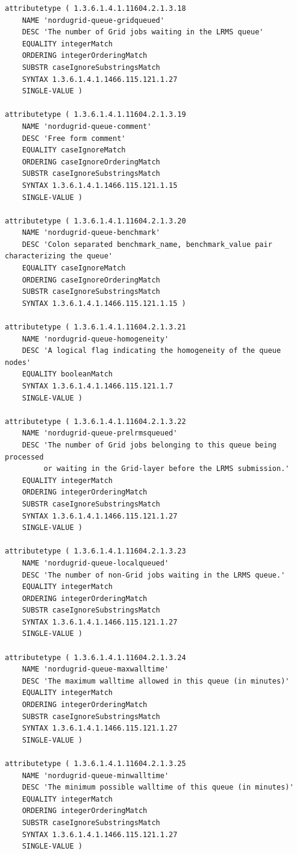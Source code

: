 \documentclass{article}
\begin{document}
\begin{verbatim}
attributetype ( 1.3.6.1.4.1.11604.2.1.3.18
    NAME 'nordugrid-queue-gridqueued'
    DESC 'The number of Grid jobs waiting in the LRMS queue'
    EQUALITY integerMatch
    ORDERING integerOrderingMatch
    SUBSTR caseIgnoreSubstringsMatch
    SYNTAX 1.3.6.1.4.1.1466.115.121.1.27
    SINGLE-VALUE )

attributetype ( 1.3.6.1.4.1.11604.2.1.3.19
    NAME 'nordugrid-queue-comment'
    DESC 'Free form comment'
    EQUALITY caseIgnoreMatch
    ORDERING caseIgnoreOrderingMatch
    SUBSTR caseIgnoreSubstringsMatch
    SYNTAX 1.3.6.1.4.1.1466.115.121.1.15
    SINGLE-VALUE )    

attributetype ( 1.3.6.1.4.1.11604.2.1.3.20
    NAME 'nordugrid-queue-benchmark'
    DESC 'Colon separated benchmark_name, benchmark_value pair characterizing the queue'
    EQUALITY caseIgnoreMatch
    ORDERING caseIgnoreOrderingMatch
    SUBSTR caseIgnoreSubstringsMatch
    SYNTAX 1.3.6.1.4.1.1466.115.121.1.15 ) 
 
attributetype ( 1.3.6.1.4.1.11604.2.1.3.21
    NAME 'nordugrid-queue-homogeneity'
    DESC 'A logical flag indicating the homogeneity of the queue nodes'
    EQUALITY booleanMatch  
    SYNTAX 1.3.6.1.4.1.1466.115.121.1.7
    SINGLE-VALUE ) 

attributetype ( 1.3.6.1.4.1.11604.2.1.3.22
    NAME 'nordugrid-queue-prelrmsqueued'
    DESC 'The number of Grid jobs belonging to this queue being processed
    	 or waiting in the Grid-layer before the LRMS submission.'      
    EQUALITY integerMatch
    ORDERING integerOrderingMatch
    SUBSTR caseIgnoreSubstringsMatch
    SYNTAX 1.3.6.1.4.1.1466.115.121.1.27
    SINGLE-VALUE )

attributetype ( 1.3.6.1.4.1.11604.2.1.3.23
    NAME 'nordugrid-queue-localqueued'
    DESC 'The number of non-Grid jobs waiting in the LRMS queue.'    
    EQUALITY integerMatch
    ORDERING integerOrderingMatch
    SUBSTR caseIgnoreSubstringsMatch
    SYNTAX 1.3.6.1.4.1.1466.115.121.1.27
    SINGLE-VALUE )
    
attributetype ( 1.3.6.1.4.1.11604.2.1.3.24
    NAME 'nordugrid-queue-maxwalltime'
    DESC 'The maximum walltime allowed in this queue (in minutes)'
    EQUALITY integerMatch
    ORDERING integerOrderingMatch
    SUBSTR caseIgnoreSubstringsMatch
    SYNTAX 1.3.6.1.4.1.1466.115.121.1.27
    SINGLE-VALUE )

attributetype ( 1.3.6.1.4.1.11604.2.1.3.25
    NAME 'nordugrid-queue-minwalltime'
    DESC 'The minimum possible walltime of this queue (in minutes)'
    EQUALITY integerMatch
    ORDERING integerOrderingMatch
    SUBSTR caseIgnoreSubstringsMatch
    SYNTAX 1.3.6.1.4.1.1466.115.121.1.27
    SINGLE-VALUE )


\end{verbatim}
\end{document}
